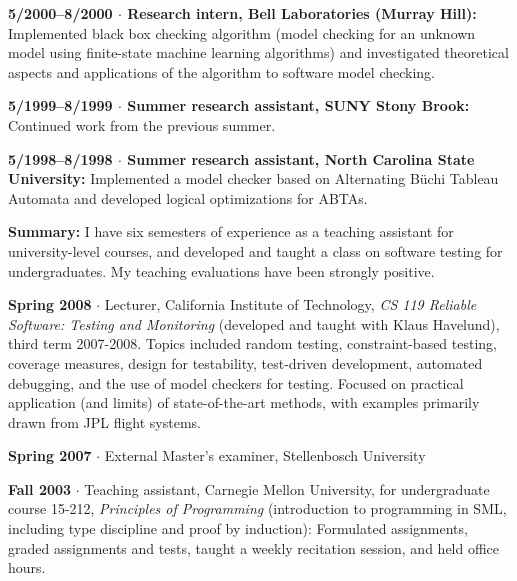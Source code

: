 \documentclass[ComputerScience]{vita}
\begin{document}
\begin{vita}
\begin{Experience}
  \item {\bf 5/2000--8/2000 $\cdot$  Research intern, Bell Laboratories (Murray Hill):}  Implemented black box checking algorithm (model checking for an unknown model using finite-state machine learning algorithms) and investigated theoretical aspects and applications of the algorithm to software model checking.

  \item {\bf 5/1999--8/1999 $\cdot$ Summer research assistant, SUNY Stony Brook:}  Continued work from the previous summer.

  \item {\bf 5/1998--8/1998 $\cdot$ Summer research assistant, North Carolina State University:}   Implemented a model checker based on Alternating B\"uchi Tableau Automata and developed logical optimizations for ABTAs.

\end{Experience}

\begin{Teaching}
\item {\bf Summary:} I have six semesters of experience as a teaching assistant for university-level courses, and developed and taught a class on software testing for undergraduates.  My teaching evaluations have been strongly positive.

  \item {\bf Spring 2008} $\cdot$ Lecturer, California Institute of
  Technology, \emph{CS 119 Reliable Software: Testing and Monitoring}
  (developed and taught with Klaus Havelund), third term 2007-2008.
  Topics included random testing, constraint-based testing, coverage
  measures, design for testability, test-driven development, automated
  debugging, and the use of model checkers for testing.  Focused on
  practical application (and limits) of state-of-the-art methods, with
  examples primarily drawn from JPL flight systems.

  \item  {\bf Spring 2007} $\cdot$ External Master's examiner, Stellenbosch University

   \item {\bf Fall 2003} $\cdot$ Teaching assistant, Carnegie Mellon
   University, for undergraduate course 15-212, \emph{Principles of
   Programming} (introduction to programming in SML, including type
   discipline and proof by induction): Formulated assignments, graded
   assignments and tests, taught a weekly recitation session, and held
   office hours.


\end{Teaching}
\end{vita}
\end{document}
